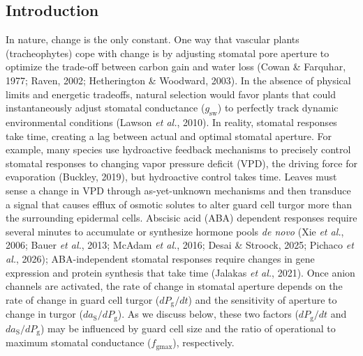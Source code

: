 \documentclass[
  letterpaper,
  DIV=11,
  numbers=noendperiod]{scrartcl}
\newcommand{\fgmax}{$f_\mathrm{gmax}$}
\newcommand{\gsw}{$g_\mathrm{sw}$}
\begin{document}
\newpage{}

\subsection{Introduction}\label{introduction}

In nature, change is the only constant. One way that vascular plants
(tracheophytes) cope with change is by adjusting stomatal pore aperture
to optimize the trade-off between carbon gain and water loss (Cowan \&
Farquhar, 1977; Raven, 2002; Hetherington \& Woodward, 2003). In the
absence of physical limits and energetic tradeoffs, natural selection
would favor plants that could instantaneously adjust stomatal
conductance (\gsw) to perfectly track dynamic environmental conditions
(Lawson \emph{et al.}, 2010). In reality, stomatal responses take time,
creating a lag between actual and optimal stomatal aperture. For
example, many species use hydroactive feedback mechanisms to precisely
control stomatal responses to changing vapor pressure deficit (VPD), the
driving force for evaporation (Buckley, 2019), but hydroactive control
takes time. Leaves must sense a change in VPD through as-yet-unknown
mechanisms and then transduce a signal that causes efflux of osmotic
solutes to alter guard cell turgor more than the surrounding epidermal
cells. Abscisic acid (ABA) dependent responses require several minutes
to accumulate or synthesize hormone pools \emph{de novo} (Xie \emph{et
al.}, 2006; Bauer \emph{et al.}, 2013; McAdam \emph{et al.}, 2016; Desai
\& Stroock, 2025; Pichaco \emph{et al.}, 2026); ABA-independent stomatal
responses require changes in gene expression and protein synthesis that
take time (Jalakas \emph{et al.}, 2021). Once anion channels are
activated, the rate of change in stomatal aperture depends on the rate
of change in guard cell turgor (\(d P_\mathrm{g} / dt\)) and the
sensitivity of aperture to change in turgor
(\(d a_\mathrm{S} / d P_\mathrm{g}\)). As we discuss below, these two
factors (\(d P_\mathrm{g} / dt\) and
\(d a_\mathrm{S} / d P_\mathrm{g}\)) may be influenced by guard cell
size and the ratio of operational to maximum stomatal conductance
(\fgmax), respectively.
\end{document}
